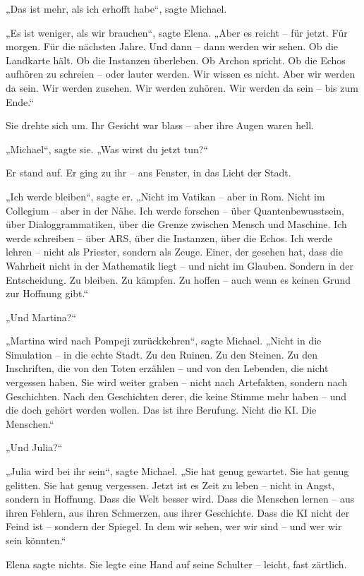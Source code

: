 \documentclass[
]{article}
\begin{document}
„Das ist mehr, als ich erhofft habe``, sagte Michael.

„Es ist weniger, als wir brauchen``, sagte Elena. „Aber es reicht -- für jetzt. Für morgen. Für die nächsten Jahre. Und dann -- dann werden wir sehen. Ob die Landkarte hält. Ob die Instanzen überleben. Ob Archon spricht. Ob die Echos aufhören zu schreien -- oder lauter werden. Wir wissen es nicht. Aber wir werden da sein. Wir werden zusehen. Wir werden zuhören. Wir werden da sein -- bis zum Ende.``

Sie drehte sich um. Ihr Gesicht war blass -- aber ihre Augen waren hell.

„Michael``, sagte sie. „Was wirst du jetzt tun?{\kern0pt}``

Er stand auf. Er ging zu ihr -- ans Fenster, in das Licht der Stadt.

„Ich werde bleiben``, sagte er. „Nicht im Vatikan -- aber in Rom. Nicht im Collegium -- aber in der Nähe. Ich werde forschen -- über Quantenbewusstsein, über Dialoggrammatiken, über die Grenze zwischen Mensch und Maschine. Ich werde schreiben -- über ARS, über die Instanzen, über die Echos. Ich werde lehren -- nicht als Priester, sondern als Zeuge. Einer, der gesehen hat, dass die Wahrheit nicht in der Mathematik liegt -- und nicht im Glauben. Sondern in der Entscheidung. Zu bleiben. Zu kämpfen. Zu hoffen -- auch wenn es keinen Grund zur Hoffnung gibt.``

„Und Martina?{\kern0pt}``

„Martina wird nach Pompeji zurückkehren``, sagte Michael. „Nicht in die Simulation -- in die echte Stadt. Zu den Ruinen. Zu den Steinen. Zu den Inschriften, die von den Toten erzählen -- und von den Lebenden, die nicht vergessen haben. Sie wird weiter graben -- nicht nach Artefakten, sondern nach Geschichten. Nach den Geschichten derer, die keine Stimme mehr haben -- und die doch gehört werden wollen. Das ist ihre Berufung. Nicht die KI. Die Menschen.``

„Und Julia?{\kern0pt}``

„Julia wird bei ihr sein``, sagte Michael. „Sie hat genug gewartet. Sie hat genug gelitten. Sie hat genug vergessen. Jetzt ist es Zeit zu leben -- nicht in Angst, sondern in Hoffnung. Dass die Welt besser wird. Dass die Menschen lernen -- aus ihren Fehlern, aus ihren Schmerzen, aus ihrer Geschichte. Dass die KI nicht der Feind ist -- sondern der Spiegel. In dem wir sehen, wer wir sind -- und wer wir sein könnten.``

Elena sagte nichts. Sie legte eine Hand auf seine Schulter -- leicht, fast zärtlich.
\end{document}
